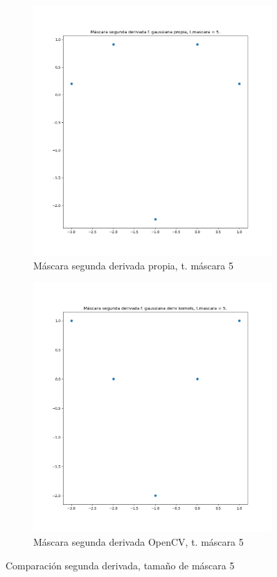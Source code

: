 \documentclass[12pt, spanish]{article}
\begin{document}
\begin{figure}[H]
  \centering
	\begin{subfigure}[t]{0.4\textwidth}
		\centering
		\includegraphics[width = \textwidth]{cmp-2p5.png}
 		 \caption{Máscara segunda derivada propia, t. máscara 5}
	\end{subfigure}
	\hspace{1cm}
	\begin{subfigure}[t]{0.4\textwidth}
		\centering
		\includegraphics[width = \textwidth]{cmp-2cv5.png}
 		 \caption{Máscara segunda derivada OpenCV, t. máscara 5}
	\end{subfigure}
	\caption{Comparación segunda derivada, tamaño de máscara 5}

  	\label{fig:ej1c5}
\end{figure}
\end{document}
